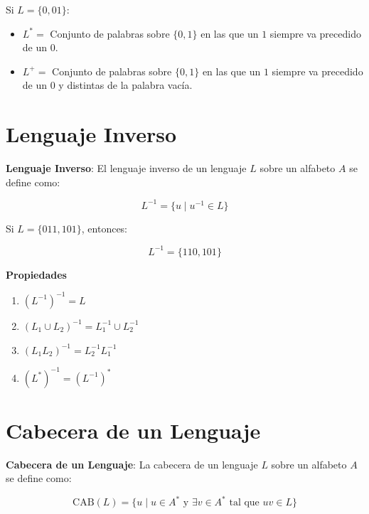 \documentclass[12pt]{report} %
\providecommand{\tightlist}{%
  \setlength{\itemsep}{0pt}\setlength{\parskip}{0pt}}
\begin{document}
\begin{ejemplo}
Si $L = \{0, 01\}$:  
    \begin{itemize}
        \item $L^* =$ Conjunto de palabras sobre $\{0, 1\}$ en las que un $1$ siempre va precedido de un $0$.  
        \item $L^+ =$ Conjunto de palabras sobre $\{0, 1\}$ en las que un $1$ siempre va precedido de un $0$ y distintas de la palabra vacía.  
    \end{itemize}
\end{ejemplo}

\hypertarget{lenguaje-inverso}{%
\section{Lenguaje Inverso}\label{lenguaje-inverso}}

\begin{definicion}
\textbf{Lenguaje Inverso}: El lenguaje inverso de un lenguaje $L$ sobre un alfabeto $A$ se define como:

$$
L^{-1} = \{u \mid u^{-1} \in L\}
$$
\end{definicion}

\begin{ejemplo}
Si $L = \{011, 101\}$, entonces:

$$
L^{-1} = \{110, 101\}
$$
\end{ejemplo}

\textbf{Propiedades}

\begin{enumerate}
\def\labelenumi{\arabic{enumi}.}
\tightlist
\item
  \((L^{-1})^{-1} = L\)\\
\item
  \((L_1 \cup L_2)^{-1} = L_1^{-1} \cup L_2^{-1}\)\\
\item
  \((L_1L_2)^{-1} = L_2^{-1}L_1^{-1}\)\\
\item
  \((L^*)^{-1} = (L^{-1})^*\)
\end{enumerate}

\hypertarget{cabecera-de-un-lenguaje}{%
\section{Cabecera de un Lenguaje}\label{cabecera-de-un-lenguaje}}

\begin{definicion}
\textbf{Cabecera de un Lenguaje}: La cabecera de un lenguaje $L$ sobre un alfabeto $A$ se define como:

$$
\text{CAB}(L) = \{u \mid u \in A^* \text{ y } \exists v \in A^* \text{ tal que } uv \in L\}
$$
\end{definicion}
\end{document}
